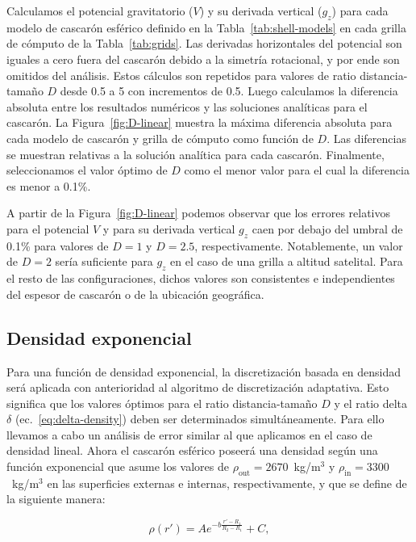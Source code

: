 Calculamos el potencial gravitatorio ($V$) y su derivada vertical ($g_z$)
para cada modelo de cascarón esférico definido en la
Tabla~\ref{tab:shell-models} en cada grilla de cómputo de la
Tabla~\ref{tab:grids}.
Las derivadas horizontales del potencial son iguales a cero fuera del cascarón
debido a la simetría rotacional, y por ende son omitidos del análisis.
Estos cálculos son repetidos para valores de ratio distancia-tamaño $D$ desde
0.5 a 5 con incrementos de 0.5.
Luego calculamos la diferencia absoluta entre los resultados numéricos y las
soluciones analíticas para el cascarón.
La Figura~\ref{fig:D-linear} muestra la máxima diferencia absoluta para cada
modelo de cascarón y grilla de cómputo como función de $D$.
Las diferencias se muestran relativas a la solución analítica para cada
cascarón.
Finalmente, seleccionamos el valor óptimo de $D$ como el menor valor para el
cual la diferencia es menor a 0.1\%.

A partir de la Figura~\ref{fig:D-linear} podemos observar que los errores
relativos para el potencial $V$ y para su derivada vertical $g_z$ caen por
debajo del umbral de 0.1\% para valores de $D=1$ y $D=2.5$, respectivamente.
Notablemente, un valor de $D=2$ sería suficiente para $g_z$ en el caso de una
grilla a altitud satelital.
Para el resto de las configuraciones, dichos valores son consistentes
e independientes del espesor de cascarón o de la ubicación geográfica.


\subsection{Densidad exponencial}

Para una función de densidad exponencial, la discretización basada en densidad
será aplicada con anterioridad al algoritmo de discretización adaptativa.
Esto significa que los valores óptimos para el ratio distancia-tamaño $D$ y el
ratio delta $\delta$ (ec.~\ref{eq:delta-density}) deben ser determinados
simultáneamente.
Para ello llevamos a cabo un análisis de error similar al que aplicamos en el
caso de densidad lineal.
Ahora el cascarón esférico poseerá una densidad según una función exponencial
que asume los valores de
$\rho_\text{out} = 2670$~kg/m$^3$ y $\rho_\text{in} = 3300$~kg/m$^3$
en las superficies externas e internas, respectivamente, y que se define de la
siguiente manera:

\begin{equation}
    \rho(r') = A e^{- b \frac{r' - R_1}{R_2 - R_1}} + C,
    \label{eq:density-exp}
\end{equation}

